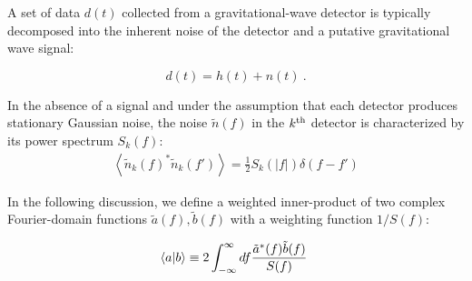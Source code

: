 \label{sec:Methods}



%
%


A set of data $d(t)$ collected from a gravitational-wave detector is typically decomposed into the inherent noise of the detector and a putative gravitational wave signal:

\begin{equation}
d(t) = h(t) + n(t)\ .
\end{equation}

In the absence of a signal and under the assumption that each detector produces stationary Gaussian noise, the noise $\tilde{n}(f)$ in the $k^{\rm th}$ detector is characterized by its power spectrum $S_k(f)$:
\begin{eqnarray}
\left<\tilde{n}_k(f)^* \tilde{n}_k(f')\right> = \frac{1}{2} S_k(|f|) \delta(f-f')
\end{eqnarray}

In the following discussion, we define a weighted inner-product of two complex Fourier-domain functions $\tilde{a}(f), \tilde{b}(f)$ with a weighting function $1/S(f)$:

\begin{eqnarray} \label{eq:InnerProduct}
\left\langle a|b\right\rangle \equiv 2 \int_{-\infty}^{\infty} df \frac{\tilde{a}^*(f)\tilde{b}(f)}{S(f)}\
\end{eqnarray}


